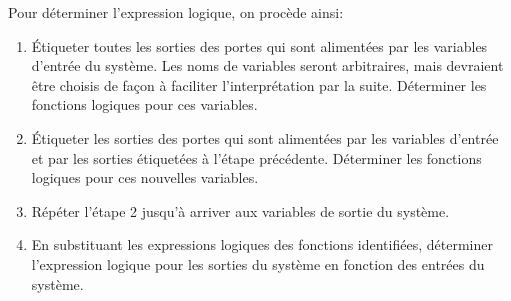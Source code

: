 \documentclass[letter, oneside]{book}
\begin{document}
Pour déterminer l'expression logique, on procède ainsi:
\begin{enumerate}
\item Étiqueter toutes les sorties des portes qui sont alimentées par les
variables d'entrée du système. Les noms de variables seront
arbitraires, mais devraient être choisis de façon à faciliter
l'interprétation par la suite. Déterminer les fonctions logiques
pour ces variables.
\item Étiqueter les sorties des portes qui sont alimentées par les
variables d'entrée et par les sorties étiquetées à l'étape
précédente. Déterminer les fonctions logiques pour ces nouvelles
variables.
\item Répéter l'étape 2 jusqu'à arriver aux variables de sortie du système.
\item En substituant les expressions logiques des fonctions identifiées,
déterminer l'expression logique pour les sorties du système en
fonction des entrées du système.
\end{enumerate}
\end{document}
